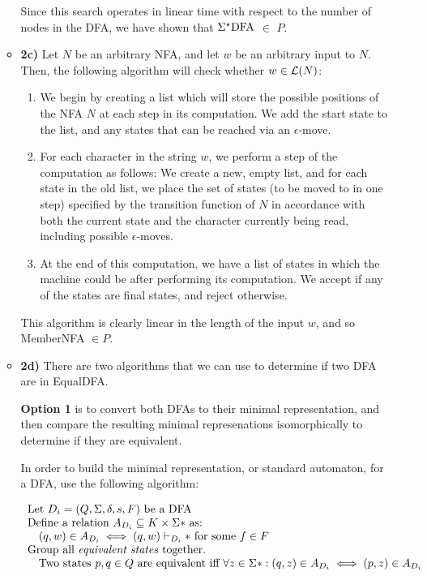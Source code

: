 \documentclass[12pt]{article}
\begin{document}
\begin{enumerate}
\begin{itemize}
Since this search operates in linear time with respect to the number of nodes in the DFA, we have shown that $\Sigma^\star\mbox{{\rm DFA}}$ $\in$ $P$.

\item \textbf{2c)} Let $N$ be an arbitrary NFA, and let $w$ be an arbitrary input to $N$. Then, the following algorithm will check whether $w \in {\cal L}(N)$:

\begin{enumerate}

\item We begin by creating a list which will store the possible positions of the NFA $N$ at each step in its computation. We add the start state to the list, and any states that can be reached via an $\epsilon$-move.

\item For each character in the string $w$, we perform a step of the computation as follows: We create a new, empty list, and for each state in the old list, we place the set of states (to be moved to in one step) specified by the transition function of $N$ in accordance with both the current state and the character currently being read, including possible $\epsilon$-moves. 

\item At the end of this computation, we have a list of states in which the machine could be after performing its computation. We accept if any of the states are final states, and reject otherwise.

\end{enumerate}

This algorithm is clearly linear in the length of the input $w$, and so MemberNFA $\in P$.

\item \textbf{2d)} There are two algorithms that we can use to determine if two DFA are in EqualDFA. 

\textbf{Option 1} is to convert both DFAs to their minimal representation, and then compare the resulting minimal represenations isomorphically to determine if they are equivalent. 

In order to build the minimal representation, or standard automaton, for a DFA, use the following algorithm:

\[
\begin{array}{l}
\textrm{Let $D_i = (Q, \Sigma, \delta, s, F)$ be a DFA} \\
\textrm{Define a relation $A_{D_i} \subseteq K \times \Sigma*$ as:} \\
\quad (q,w) \in A_{D_i} \iff (q,w) \vdash_{D_i}* \textrm{ for some } f \in F \\
\textrm{Group all \textit{equivalent states} together.} \\
\quad \textrm{Two states $p,q \in Q$ are equivalent iff } \forall z \in \Sigma*: (q,z) \in A_{D_i} \iff (p,z) \in A_{D_i} \\
\end{array}
\]


\end{itemize}
\end{enumerate}
\end{document}
